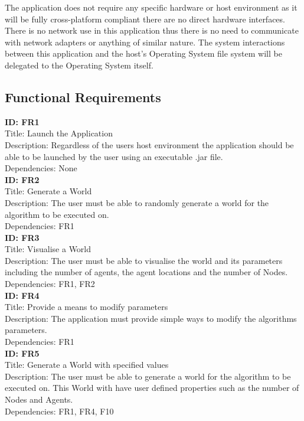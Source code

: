 \documentclass[10pt,a4paper]{article}
\begin{document}
The application does not require any specific hardware or host environment as it will be fully cross-platform compliant there are no direct hardware interfaces. There is no network use in this application thus there is no need to communicate with network adapters or anything of similar nature. The system interactions between this application and the host's Operating System file system will be delegated to the Operating System itself.

\subsection{Functional Requirements}
\label{funcreq}
\textbf{ID: FR1}\\
Title: Launch the Application\\
Description: Regardless of the users host environment the application should be able to be launched by the user using an executable .jar file.\\
Dependencies: None
\\

\noindent
\textbf{ID: FR2}\\
Title: Generate a World\\
Description: The user must be able to randomly generate a world for the algorithm to be executed on.\\
Dependencies: FR1
\\

\noindent
\textbf{ID: FR3}\\
Title: Visualise a World\\
Description: The user must be able to visualise the world and its parameters including the number of agents, the agent locations and the number of Nodes.\\
Dependencies: FR1, FR2
\\

\noindent
\textbf{ID: FR4}\\
Title: Provide a means to modify parameters\\
Description: The application must provide simple ways to modify the algorithms parameters.\\
Dependencies: FR1
\\

\noindent
\textbf{ID: FR5}\\
Title: Generate a World with specified values\\
Description: The user must be able to generate a world for the algorithm to be executed on. This World with have user defined properties such as the number of Nodes and Agents.\\
Dependencies: FR1, FR4, F10
\\
\end{document}
